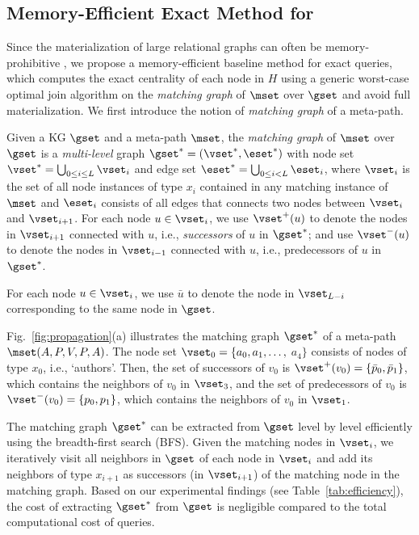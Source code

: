 \subsection{Memory-Efficient Exact Method for \ced}
\label{sec:wcoj}

Since the materialization of large relational graphs can often be memory-prohibitive \cite{xirogiannopoulos2017extracting}, we propose a memory-efficient baseline method for exact \ced queries, which computes the exact centrality of each node in $H$ using a generic worst-case optimal join algorithm \cite{ngo2018worst, freitag2020adopting, arroyuelo2021worst, veldhuizen2014leapfrog} on the \emph{matching graph} of $\mset$ over $\gset$ and avoid full materialization.
We first introduce the notion of \emph{matching graph} of a meta-path.
\begin{definition}
  Given a KG $\gset$ and a meta-path $\mset$, the \emph{matching graph} of $\mset$ over $\gset$ is a \emph{multi-level} graph $\gset^*=(\vset^*,\eset^*)$ with node set $\vset^*=\bigcup_{0 \leq i \leq L}{\vset_i}$ and edge set $\eset^* = \bigcup_{0 \leq i < L}{\eset_i}$, where $\vset_i$ is the set of all node instances of type $x_i$ contained in any matching instance of $\mset$ and $\eset_i$ consists of all edges that connects two nodes between $\vset_i$ and $\vset_{i+1}$. For each node $u\in\vset_i$, we use $\vset^+(u)$ to denote the nodes in $\vset_{i+1}$ connected with $u$, i.e., \emph{successors} of $u$ in $\gset^*$; and use $\vset^-(u)$ to denote the nodes in $\vset_{i-1}$ connected with $u$, i.e., predecessors of $u$ in $\gset^*$.
\end{definition}

For each node $u\in\vset_i$, we use $\bar{u}$ to denote the node in $\vset_{L-i}$ corresponding to the same node in $\gset$.

\begin{example}
  Fig.~\ref{fig:propagation}(a) illustrates the matching graph $\gset^*$ of a meta-path $\mset(A, P, V, P, A)$.
  The node set $\vset_0=\{a_0, a_1, \dots,$ $a_4\}$ consists of nodes of type $x_0$, i.e., `authors'.
  Then, the set of successors of $v_0$ is $\vset^+(v_0)=\{\bar{p}_0, \bar{p}_1\}$, which contains the neighbors of $v_0$ in $\vset_3$, and the set of predecessors of $v_0$ is $\vset^-(v_0)=\{p_0, p_1\}$, which contains the neighbors of $v_0$ in $\vset_1$.
\end{example}

The matching graph $\gset^*$ can be extracted from $\gset$ level by level efficiently using the breadth-first search (BFS).
Given the matching nodes in $\vset_i$, we iteratively visit all neighbors in $\gset$ of each node in $\vset_i$ and add its neighbors of type $x_{i+1}$ as successors (in $\vset_{i+1}$) of the matching node in the matching graph.
Based on our experimental findings (see Table~\ref{tab:efficiency}), the cost of extracting $\gset^*$ from $\gset$ is negligible compared to the total computational cost of \ced queries.

